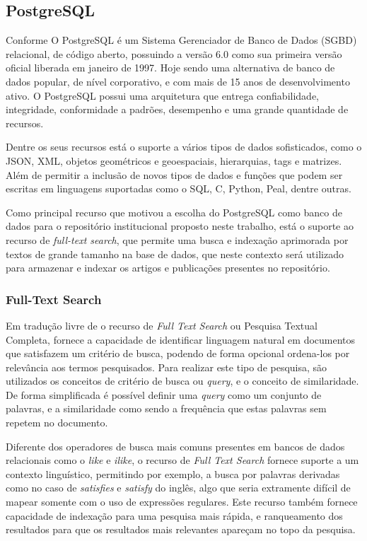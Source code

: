 \subsection{PostgreSQL}

Conforme \cite{2017:Carvalho} O PostgreSQL é um Sistema Gerenciador de
Banco de Dados (SGBD) relacional, de código aberto, possuindo a versão 6.0
como sua primeira versão oficial liberada em janeiro de 1997.
Hoje sendo uma alternativa de banco de dados popular, de nível corporativo,
e com mais de 15 anos de desenvolvimento ativo. O PostgreSQL possui uma
arquitetura que entrega confiabilidade, integridade, conformidade a padrões,
desempenho e uma grande quantidade de recursos.

Dentre os seus recursos está o suporte a vários tipos de dados sofisticados,
como o JSON, XML, objetos geométricos e geoespaciais, hierarquias, tags e matrizes.
Além de permitir a inclusão de novos tipos de dados e funções que podem ser
escritas em linguagens suportadas como o SQL, C, Python, Peal, dentre outras.

Como principal recurso que motivou a escolha do PostgreSQL como banco de dados
para o repositório institucional proposto neste trabalho, está o suporte ao
recurso de \emph{full-text search}, que permite uma busca e indexação aprimorada
por textos de grande tamanho na base de dados, que neste contexto será
utilizado para armazenar e indexar os artigos e publicações presentes no repositório.

\subsubsection{Full-Text Search}

Em tradução livre de \cite{2022:PostgreSQL}
o recurso de \emph{Full Text Search} ou Pesquisa Textual Completa,
fornece a capacidade de identificar linguagem natural em documentos
que satisfazem um critério de busca, podendo de forma opcional ordena-los
por relevância aos termos pesquisados. Para realizar este tipo de pesquisa,
são utilizados os conceitos de critério de busca ou \emph{query}, e o
conceito de similaridade. De forma simplificada é possível definir uma
\emph{query} como um conjunto de palavras, e a similaridade como sendo a
frequência que estas palavras sem repetem no documento.

Diferente dos operadores de busca mais comuns presentes em bancos de dados
relacionais como o \emph{like} e \emph{ilike}, o recurso de \emph{Full Text Search}
fornece suporte a um contexto linguístico, permitindo por exemplo, a busca por palavras
derivadas como no caso de \emph{satisfies} e \emph{satisfy} do inglês, algo que
seria extramente difícil de mapear somente com o uso de expressões regulares. Este recurso
também fornece capacidade de indexação para uma pesquisa mais rápida, e ranqueamento
dos resultados para que os resultados mais relevantes apareçam no topo da pesquisa.

